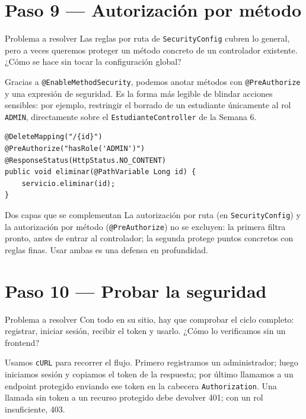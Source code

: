 \documentclass[11pt]{article}
\begin{document}
\section{Paso 9 --- Autorización por método}
\begin{cajaproblema}{Problema a resolver}
Las reglas por ruta de \texttt{SecurityConfig} cubren lo general, pero a veces queremos proteger un método concreto de un controlador existente. ¿Cómo se hace sin tocar la configuración global?\par
\end{cajaproblema}
Gracias a \texttt{@EnableMethodSecurity}, podemos anotar métodos con \texttt{@PreAuthorize} y una expresión de seguridad. Es la forma más legible de blindar acciones sensibles: por ejemplo, restringir el borrado de un estudiante únicamente al rol \texttt{ADMIN}, directamente sobre el \texttt{EstudianteController} de la Semana 6.

\begin{cajacodigo}
\begin{lstlisting}[style=java]
@DeleteMapping("/{id}")
@PreAuthorize("hasRole('ADMIN')")
@ResponseStatus(HttpStatus.NO_CONTENT)
public void eliminar(@PathVariable Long id) {
    servicio.eliminar(id);
}
\end{lstlisting}
\end{cajacodigo}

\begin{cajatip}{Dos capas que se complementan}
La autorización por ruta (en \texttt{SecurityConfig}) y la autorización por método (\texttt{@PreAuthorize}) no se excluyen: la primera filtra pronto, antes de entrar al controlador; la segunda protege puntos concretos con reglas finas. Usar ambas es una defensa en profundidad.\par
\end{cajatip}

\section{Paso 10 --- Probar la seguridad}
\begin{cajaproblema}{Problema a resolver}
Con todo en su sitio, hay que comprobar el ciclo completo: registrar, iniciar sesión, recibir el token y usarlo. ¿Cómo lo verificamos sin un frontend?\par
\end{cajaproblema}
Usamos \texttt{cURL} para recorrer el flujo. Primero registramos un administrador; luego iniciamos sesión y copiamos el token de la respuesta; por último llamamos a un endpoint protegido enviando ese token en la cabecera \texttt{Authorization}. Una llamada sin token a un recurso protegido debe devolver 401; con un rol insuficiente, 403.
\end{document}
